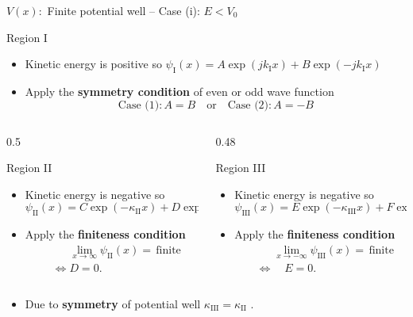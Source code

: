 %
\begin{frame}{\(V(x) :\) Finite potential well -- Case (i): \(E < V_0\)}
\begin{footnotesize}
		\begin{block}{Region I}
		\begin{itemize}
			\item Kinetic energy is positive so \hfill
			\(
			\psi_\text{I}(x) = A \exp (j k_\text{I} x) + B \exp (- j k_\text{I} x)
			\)
			\item Apply the \textbf{symmetry condition} of even or odd wave function
			\[
			\text{Case (1):} \, A = B \quad \text{or} \quad \text{Case (2):} \, A=-B
			\]
		\end{itemize}
	\end{block}
\end{footnotesize}
	\vspace{-4ex}
\begin{footnotesize}
	\begin{columns}
	\begin{column}[t]{0.5\textwidth}
		\begin{block}{Region II}
			\begin{itemize}
				\item Kinetic energy is negative so
				\[
				\psi_\text{II}(x) = C \exp (- \kappa_\text{II} x) + D \exp (+ \kappa_\text{II} x)
				\]
				\item Apply the \textbf{finiteness condition}
				\begin{align*}
					&\phantom{\Leftrightarrow}\lim_{x\rightarrow \infty} \psi_\text{II}(x) = \, \text{finite} \\
					&\Leftrightarrow D=0.
				\end{align*}
			\end{itemize}
		\end{block}
	\end{column}
	\begin{column}[t]{0.48\textwidth}
			\begin{block}{Region III}
			\begin{itemize}
				\item Kinetic energy is negative so
				\[
				\psi_\text{III}(x) = E \exp (- \kappa_\text{III} x) + F \exp  (\kappa_\text{III} x)
				\]
				\item Apply the \textbf{finiteness condition}
				\begin{align*}
					&\phantom{\Leftrightarrow}\lim_{x\rightarrow -\infty} \psi_\text{III}(x) = \, \text{finite} \\
					& \Leftrightarrow \quad E=0.
				\end{align*}
			\end{itemize}
		\end{block}
	\end{column}
\end{columns}
\end{footnotesize}
	\begin{itemize}
		\item Due to \textbf{symmetry} of potential well
		\(
		\kappa_\text{III} = \kappa_\text{II}
		\)
		.
	\end{itemize}
\end{frame}
